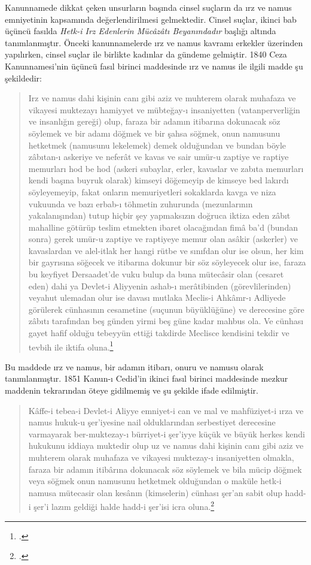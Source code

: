 Kanunnamede dikkat çeken unsurların başında cinsel suçların da ırz ve namus emniyetinin kapsamında değerlendirilmesi gelmektedir. Cinsel suçlar, ikinci bab üçüncü fasılda \textit{Hetk-i Irz Edenlerin Mücâzâtı Beyanındadır} başlığı altında tanımlanmıştır.
Önceki kanunnamelerde ırz ve namus kavramı erkekler üzerinden yapılırken, cinsel suçlar ile birlikte kadınlar da gündeme gelmiştir. 1840 Ceza Kanunnamesi'nin üçüncü fasıl birinci maddesinde ırz ve namus ile ilgili madde şu şekildedir:
\begin{quote}
Irz ve namus dahi kişinin canı gibi aziz ve muhterem olarak muhafaza ve vikayesi muktezayı hamiyyet ve mübteğay-ı insaniyetten (vatanperverliğin ve insanlığın gereği) olup, faraza bir adamın itibarına dokunacak söz söylemek ve bir adamı döğmek ve bir şahsa söğmek, onun namusunu hetketmek (namusunu lekelemek) demek olduğundan ve bundan böyle zâbıtan-ı askeriye ve neferât ve kavas ve sair umür-u zaptiye ve raptiye memurları hod be hod (askeri subaylar, erler, kavaslar ve zabıta memurları kendi başına buyruk olarak) kimseyi döğemeyip de kimseye bed lakırdı söyleyemeyip, fakat onların memuriyetleri sokaklarda kavga ve niza vukuunda ve bazı erbab-ı töhmetin zuhurunda (mezunlarının yakalanışından) tutup hiçbir şey yapmaksızın doğruca iktiza eden zâbıt mahalline götürüp teslim etmekten ibaret olacağından fimâ ba'd (bundan sonra) gerek umür-u zaptiye ve raptiyeye memur olan asâkir (askerler) ve kavaslardan ve alel-itlak her hangi rütbe ve sınıfdan olur ise olsun, her kim bir gayrısına söğecek ve itibarına dokunur bir söz söyleyecek olur ise, faraza bu keyfiyet Dersaadet'de vuku bulup da buna mütecâsir olan (cesaret eden) dahi ya Devlet-i Aliyyenin ashab-ı merâtibinden (görevlilerinden) veyahut ulemadan olur ise davası mutlaka Meclis-i Ahkâmr-ı Adliyede görülerek cünhasının cesametine (suçunun büyüklüğüne) ve derecesine göre zâbıtı tarafından beş günden yirmi beş güne kadar mahbus ola. Ve cünhası gayet hafif olduğu tebeyyün ettiği takdirde Meclisce kendisini tekdir ve tevbih ile iktifa oluna.\footcite[812-813]{islam_osmanli_hukuku}
\end{quote}
Bu maddede ırz ve namus, bir adamın itibarı, onuru ve namusu olarak tanımlanmıştır. 1851 Kanun-ı Cedid'in ikinci fasıl birinci maddesinde mezkur maddenin tekrarından öteye gidilmemiş ve  şu şekilde ifade edilmiştir.
\begin{quote}
Kâffe-i tebea-i Devlet-i Aliyye emniyet-i can ve mal ve mahfüziyet-i ırza ve namus hukuk-u şer'iyesine nail olduklarından serbestiyet derecesine varmayarak ber-muktezay-ı bürriyet-i şer'iyye küçük ve büyük herkes kendi hukukunu iddiaya muktedir olup uz ve namus dahi kişinin canı gibi aziz ve muhterem olarak muhafaza ve vikayesi muktezay-ı insaniyetten olmakla, faraza bir adamın itibârına dokunacak söz söylemek ve bila mücip döğmek veya söğmek onun namusunu hetketmek olduğundan o maküle hetk-i namusa mütecasir olan kesânın (kimselerin) cünhası şer'an sabit olup hadd-i şer'i lazım geldiği halde hadd-i şer'isi icra oluna.\footcite[825]{islam_osmanli_hukuku}
\end{quote}

